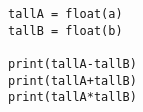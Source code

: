 %
%
\begin {lstlisting}
tallA = float(a)
tallB = float(b)

print(tallA-tallB)
print(tallA+tallB)
print(tallA*tallB)
\end{lstlisting}
